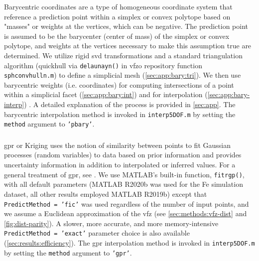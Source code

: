 \documentclass[final,twocolumn,12pt]{elsarticle}
\newcommand{\inpt}{input}
\newcommand{\outpt}{prediction}
\newcommand{\vfzorepo}{\gls{vfzo} repository}
\begin{document}
{Barycentric coordinates are a type of homogeneous coordinate system that reference a \outpt{} point within a simplex \cite{langerSphericalBarycentricCoordinates2006} or convex polytope \cite{floaterGeneralizedBarycentricCoordinates2015,meyerGeneralizedBarycentricCoordinates2002,langerSphericalBarycentricCoordinates2006} based on "masses" or weights at the vertices, which can be negative. The \outpt{} point is assumed to be the barycenter (center of mass) of the simplex or convex polytope, and weights at the vertices necessary to make this assumption true are determined. We utilize rigid \gls{svd} transformations and a standard triangulation algorithm (quickhull \cite{barberQuickhullAlgorithmConvex1996} via \texttt{delaunayn()} in \vfzorepo{} function \texttt{sphconvhulln.m}) to define a simplicial mesh (\cref{sec:app:bary:tri}). We then use barycentric weights (i.e. coordinates) for computing intersections of a point within a simplicial facet (\cref{sec:app:bary:int}) and for interpolation (\cref{sec:app:bary-interp}) \cite{langerSphericalBarycentricCoordinates2006}. A detailed explanation of the process is provided in \cref{sec:app}. The barycentric interpolation method is invoked in \texttt{interp5DOF.m} by setting the \texttt{method} argument to \texttt{'pbary'}.

\subsubsection{}
\label{sec:methods:interp:gpr}


\Gls{gpr} or Kriging uses the notion of similarity between points to fit Gaussian processes (random variables) to data based on prior information and provides uncertainty information in addition to interpolated or inferred values. For a general treatment of \gls{gpr}, see \cite{rasmussenGaussianProcessesMachine2006}. We use MATLAB's built-in function, \texttt{fitrgp()}, with all default parameters (MATLAB R2020b was used for the Fe simulation dataset, all other results employed MATLAB R2019b) except that \texttt{PredictMethod = 'fic'} was used regardless of the number of \inpt{} points, and we assume a Euclidean approximation of the \gls{vfz} (see \cref{sec:methods:vfz-dist} and \cref{fig:dist-parity}). A slower, more accurate, and more memory-intensive \texttt{PredictMethod = 'exact'} parameter choice is also available (\cref{sec:results:efficiency}). The \gls{gpr} interpolation method is invoked in \texttt{interp5DOF.m} by setting the \texttt{method} argument to \texttt{'gpr'}.

}
\end{document}
